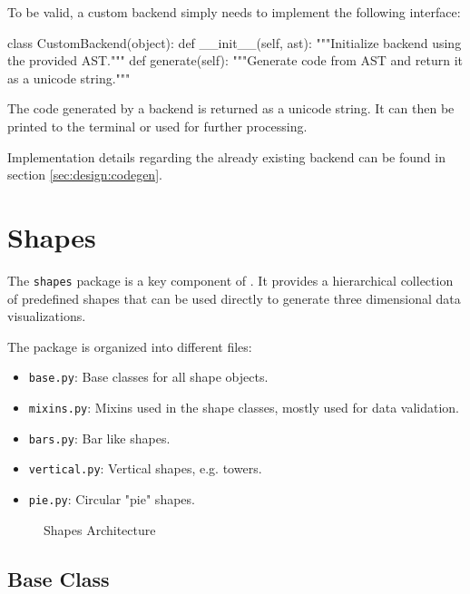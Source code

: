 To be valid, a custom backend simply needs to implement the following interface:

\vspace{.5\baselineskip}
\begin{pythoncode}
class CustomBackend(object):
    def __init__(self, ast):
        """Initialize backend using the provided AST."""
    def generate(self):
        """Generate code from AST and return it
        as a unicode string."""
\end{pythoncode}

\noindent The code generated by a backend is returned as a unicode string. It
can then be printed to the terminal or used for further processing.

Implementation details regarding the already existing backend can be found in
section \ref{sec:design:codegen}.


\section{Shapes}\label{sec:architecture:shapes}

The \texttt{shapes} package is a key component of \tangible{}. It provides a
hierarchical collection of predefined shapes that can be used directly to
generate three dimensional data visualizations.

The package is organized into different files:

\begin{itemize}
	\item \texttt{base.py}: Base classes for all shape objects.
	\item \texttt{mixins.py}: Mixins used in the shape classes, mostly used for
		data validation.
	\item \texttt{bars.py}: Bar like shapes.
	\item \texttt{vertical.py}: Vertical shapes, e.g. towers.
	\item \texttt{pie.py}: Circular "pie" shapes.
\end{itemize}

\begin{figure}[H]
	\centering
	
	\caption{Shapes Architecture}
	\label{img:shapes}
\end{figure}

\subsection{Base Class}

